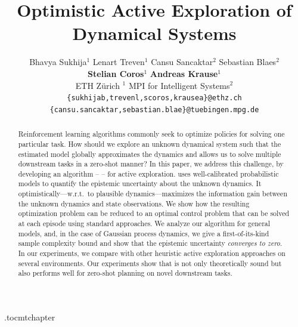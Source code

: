 \documentclass{article}
\title{Optimistic Active Exploration of Dynamical Systems}
\author{
Bhavya Sukhija$^{1}$ \quad Lenart Treven$^{1}$ \quad Cansu Sancaktar$^2$ \quad Sebastian Blaes$^2$ \\ \textbf{Stelian Coros}$^1$ 
\textbf{Andreas Krause}$^1$ \\
ETH Zürich $^1$ \quad MPI for Intelligent Systems$^2$ \\
\texttt{\{sukhijab,trevenl,scoros,krausea\}@ethz.ch}\\
\texttt{\{cansu.sancaktar,sebastian.blae\}@tuebingen.mpg.de}
}
\begin{document}
\etocdepthtag.toc{mtchapter}

\maketitle


\begin{abstract}
Reinforcement learning algorithms commonly seek to optimize policies for solving one particular task. How should we explore an unknown dynamical system such that the estimated model globally approximates the dynamics and allows us to solve multiple downstream tasks in a zero-shot manner? 
In this paper, we address this challenge, by developing an algorithm -- \opacex -- for active exploration. \opacex uses well-calibrated probabilistic models to quantify the epistemic uncertainty about the unknown dynamics. It optimistically---w.r.t.~to plausible dynamics---maximizes the information gain between the unknown dynamics and state observations.  
We show how the resulting optimization problem can be reduced to an optimal control problem that can be solved at each episode using standard approaches. 
We analyze
our algorithm for general models, and, in the case of Gaussian process dynamics, we give a first-of-its-kind sample complexity bound and
show that the epistemic uncertainty \emph{converges to zero}. 
In our experiments, we compare \opacex with other heuristic active exploration approaches on several environments.
Our experiments show that \opacex is not only theoretically sound but also performs well for zero-shot planning on novel downstream tasks.


\end{abstract}
\end{document}
